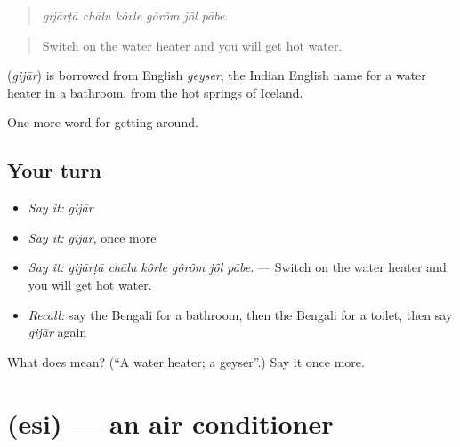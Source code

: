 \begin{quote}
     
\end{quote}

\begin{quote}
\emph{gijārṭā chālu kôrle gôrôm jôl pābe.}
\end{quote}

\begin{quote}
Switch on the water heater and you will get hot water.
\end{quote}

\begin{cousinweb}
\textbf{} (\emph{gijār}) is borrowed from English \emph{geyser}, the Indian English name for a water heater in a bathroom, from the hot springs of Iceland.
\end{cousinweb}

\begin{grammarlens}[title={What you've built}]
One more word for getting around.
\end{grammarlens}

\subsection*{Your turn}
\begin{itemize}
\raggedright
  \item \emph{Say it:} \emph{gijār}
  \item \emph{Say it:} \emph{gijār}, once more
  \item \emph{Say it:} \emph{gijārṭā chālu kôrle gôrôm jôl pābe.} — Switch on the water heater and you will get hot water.
  \item \emph{Recall:} say the Bengali for a bathroom, then the Bengali for a toilet, then say \emph{gijār} again
\end{itemize}

\begin{tcolorbox}[breakable,colback=teal!4,colframe=teal!35!black,title={Before you move on}]
What does  mean? (\textquotedblleft{}A water heater; a geyser\textquotedblright{}.) Say it once more.
\end{tcolorbox}
\section[\texorpdfstring{\bn{এসি} (esi)}{এসি (esi)}]{ (esi) — an air conditioner}

\label{lesson:BN-C405-esi}



